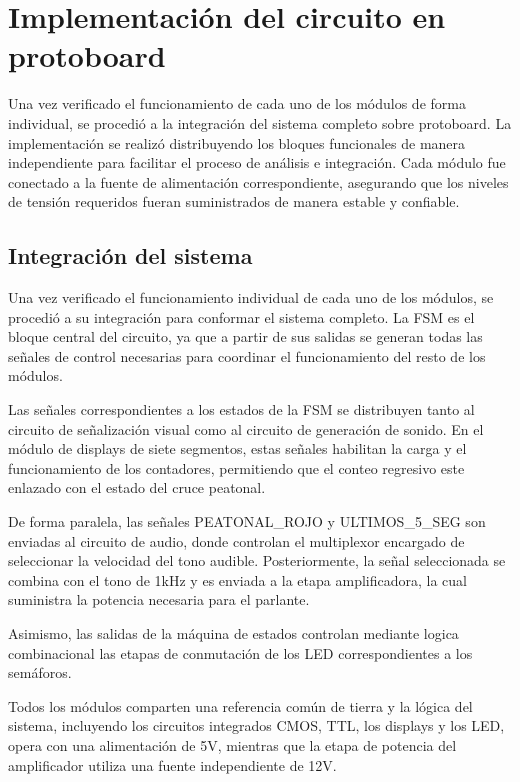 \documentclass[12pt, journal, onecolumn]{IEEEtran}
\begin{document}
\newpage
	
\section{Implementación del circuito en protoboard}

Una vez verificado el funcionamiento de cada uno de los módulos de forma individual, se procedió a la integración del sistema completo sobre protoboard. La implementación se realizó distribuyendo los bloques funcionales de manera independiente para facilitar el proceso de análisis e integración. Cada módulo fue conectado a la fuente de alimentación correspondiente, asegurando que los niveles de tensión requeridos fueran suministrados de manera estable y confiable.

\subsection{Integración del sistema}

Una vez verificado el funcionamiento individual de cada uno de los módulos, se procedió a su integración para conformar el sistema completo. La FSM es el bloque central del circuito, ya que a partir de sus salidas se generan todas las señales de control necesarias para coordinar el funcionamiento del resto de los módulos.

Las señales correspondientes a los estados de la FSM se distribuyen tanto al circuito de señalización visual como al circuito de generación de sonido. En el módulo de displays de siete segmentos, estas señales habilitan la carga y el funcionamiento de los contadores, permitiendo que el conteo regresivo este enlazado con el estado del cruce peatonal.

De forma paralela, las señales PEATONAL\_ROJO y ULTIMOS\_5\_SEG son enviadas al circuito de audio, donde controlan el multiplexor encargado de seleccionar la velocidad del tono audible. Posteriormente, la señal seleccionada se combina con el tono de 1kHz y es enviada a la etapa amplificadora, la cual suministra la potencia necesaria para el parlante.

Asimismo, las salidas de la máquina de estados controlan mediante logica combinacional las etapas de conmutación de los LED correspondientes a los semáforos.

Todos los módulos comparten una referencia común de tierra y la lógica del sistema, incluyendo los circuitos integrados CMOS, TTL, los displays y los LED, opera con una alimentación de 5V, mientras que la etapa de potencia del amplificador utiliza una fuente independiente de 12V.
\end{document}

